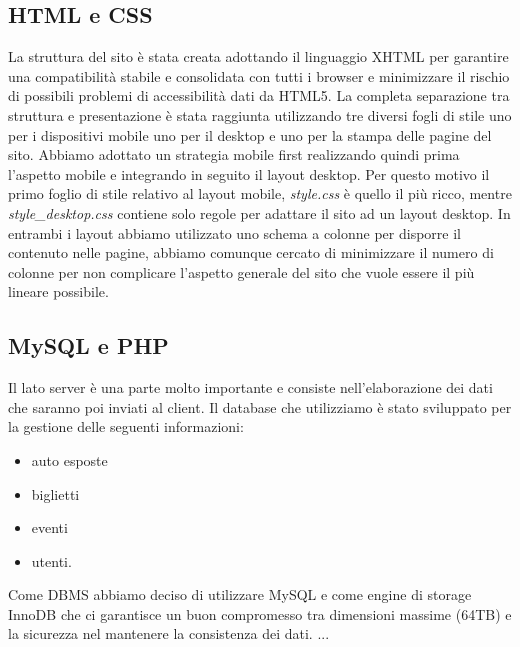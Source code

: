 \subsection{HTML e CSS}
La struttura del sito è stata creata adottando il linguaggio XHTML per garantire una compatibilità stabile e consolidata con tutti i browser e minimizzare il rischio di possibili problemi di accessibilità dati da HTML5.
La completa separazione tra struttura e presentazione è stata raggiunta utilizzando tre diversi fogli di stile uno per i dispositivi mobile uno per il desktop e uno per la stampa delle pagine del sito. Abbiamo adottato un strategia mobile first realizzando quindi prima l'aspetto mobile e integrando in seguito il layout desktop. Per questo motivo il primo foglio di stile relativo al layout mobile, \textit{style.css} è quello il più ricco, mentre \textit{style\_desktop.css} contiene solo regole per adattare il sito ad un layout desktop. In entrambi i layout abbiamo utilizzato uno schema a colonne per disporre il contenuto nelle pagine, abbiamo comunque cercato di minimizzare il numero di colonne per non complicare l'aspetto generale del sito che vuole essere il più lineare possibile.

\subsection{MySQL e PHP}
	Il lato server è una parte molto importante e consiste nell'elaborazione dei dati che saranno poi inviati al
	client. Il database che utilizziamo è stato sviluppato per la gestione delle seguenti informazioni:
	\begin{itemize}
		\item auto esposte 
		\item biglietti
		\item eventi
		\item utenti.
	\end{itemize}
	Come DBMS abbiamo deciso di utilizzare MySQL e come engine di storage InnoDB che
	ci garantisce un buon compromesso
	tra dimensioni massime (64TB) e la sicurezza nel mantenere la consistenza dei dati. 
	...
